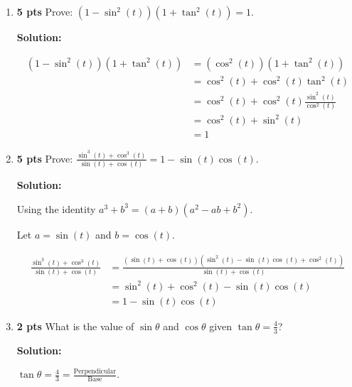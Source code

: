 \documentclass[nohyper,nobib,xcolor=dvipsnames,svgnames,x11names]{tufte-book}
\newenvironment{multiequation}{%
  \setlength{\abovedisplayskip}{3pt}      %
  \setlength{\belowdisplayskip}{6pt}      %
  \setlength{\abovedisplayshortskip}{3pt} %
  \setlength{\belowdisplayshortskip}{6pt} %
  \begin{equation}%
    \begin{aligned}%
}{%
    \end{aligned}%
  \end{equation}%
}
\begin{document}
\begin{enumerate}
    This gives two possible solutions:
    
    $2\sin x - 1 = 0 \implies \sin x = \frac{1}{2}$.
    
    $\sin x - 1 = 0 \implies \sin x = 1$.

    For $\sin x = \frac{1}{2}$, $x = \frac{\pi}{6}$ or $x = \frac{5\pi}{6}$.
    
    For $\sin x = 1$, $x = \frac{\pi}{2}$.
    
    The general solutions are $x = \frac{\pi}{6}+2\pi K$, $x = \frac{5\pi}{6}+2\pi K$, and $x = \frac{\pi}{2}+2\pi K$.

    \item \textbf{5 pts} Prove: $(1-\sin^2(t))(1+\tan^2(t))=1$.
    
    \textbf{Solution:}
    
    \begin{multiequation}
        (1-\sin^2(t))(1+\tan^2(t)) &= (\cos^2(t))(1+\tan^2(t)) \\
        &= \cos^2(t) + \cos^2(t)\tan^2(t) \\
        &= \cos^2(t) + \cos^2(t)\frac{\sin^2(t)}{\cos^2(t)} \\
        &= \cos^2(t) + \sin^2(t) \\
        &= 1
    \end{multiequation}

    \item \textbf{5 pts} Prove: $\frac{\sin^3(t)+\cos^3(t)}{\sin(t)+\cos(t)}=1-\sin(t)\cos(t)$.
    
    \textbf{Solution:}
    
    Using the identity $a^3+b^3=(a+b)(a^2-ab+b^2)$.
    
    Let $a=\sin(t)$ and $b=\cos(t)$.

    \begin{multiequation}
        \frac{\sin^3(t)+\cos^3(t)}{\sin(t)+\cos(t)} &= \frac{(\sin(t)+\cos(t))(\sin^2(t)-\sin(t)\cos(t)+\cos^2(t))}{\sin(t)+\cos(t)} \\
        &= \sin^2(t)+\cos^2(t)-\sin(t)\cos(t) \\
        &= 1-\sin(t)\cos(t)
    \end{multiequation}

    \item \textbf{2 pts} What is the value of $\sin\theta$ and $\cos\theta$ given $\tan\theta=\frac{4}{3}$?
    
    \textbf{Solution:}
    
    $\tan\theta = \frac{4}{3} = \frac{\text{Perpendicular}}{\text{Base}}$.
    

\end{enumerate}
\end{document}
